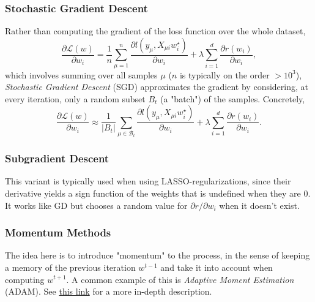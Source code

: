\documentclass{article}
\begin{document}
\subsubsection*{Stochastic Gradient Descent}
Rather than computing the gradient of the loss function over the whole dataset,
\begin{equation}
    \frac{\partial\mathcal{L}(w)}{\partial w_i}
    =
    \frac{1}{n}\sum_{\mu = 1}^{n} \frac{\partial l(y_{\mu}, X_{\mu i} w^{\star}_i)}{\partial w_i}
    +
    \lambda \sum_{i=1}^{d} \frac{\partial r(w_i)}{\partial w_i},
\end{equation}
which involves summing over all samples $\mu$ ($n$ is typically on the order $>10^3$), \emph{Stochastic Gradient Descent} (SGD) approximates the gradient by considering, at every iteration, only a random subset $B_t$ (a "batch") of the samples. Concretely,
\begin{equation}
    \frac{\partial\mathcal{L}(w)}{\partial w_i}
    \approx
    \frac{1}{|B_t|}\sum_{\mu \in \mathcal{B}_t} \frac{\partial l(y_{\mu}, X_{\mu i} w^{\star}_i)}{\partial w_i}
    +
    \lambda \sum_{i=1}^{d} \frac{\partial r(w_i)}{\partial w_i}.
\end{equation}

\subsubsection*{Subgradient Descent}
This variant is typically used when using LASSO-regularizations, since their derivative yields a sign function of the weights that is undefined when they are 0. It works like GD but chooses a random value for $\partial r/\partial w_i$ when it doesn't exist.
\subsubsection*{Momentum Methods}
The idea here is to introduce "momentum" to the process, in the sense of keeping a memory of the previous iteration $w^{t-1}$ and take it into account when computing $w^{t+1}$. A common example of this is \emph{Adaptive Moment Estimation} (ADAM). See \href{https://en.wikipedia.org/wiki/Stochastic_gradient_descent#Momentum}{this link} for a more in-depth description.
\end{document}
